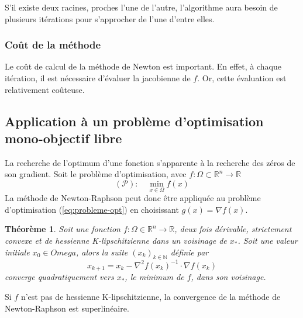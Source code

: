 \documentclass[3p, twocolumn]{elsarticle}
\newtheorem{thm}{Théorème}
\begin{document}
\begin{rmk}
S'il existe deux racines, proches l'une de l'autre, l'algorithme aura besoin de plusieurs itérations pour s'approcher de l'une d'entre elles.
\end{rmk}

\subsubsection{Coût de la méthode}
Le coût de calcul de la méthode de Newton est important. En effet, à chaque itération, il est nécessaire d’évaluer la jacobienne de $f$. Or, cette évaluation est relativement coûteuse.

\subsection{Application à un problème d'optimisation mono-objectif libre}
La recherche de l'optimum d'une fonction s'apparente à la recherche des zéros de son gradient.
Soit le problème d'optimisation, avec $f:\Omega \subset \mathbb{R}^n \rightarrow \mathbb{R}$
\begin{equation}
    (\mathscr{P}):\quad\min_{x\in \Omega} f(x)
    \label{eq:probleme-opt}
\end{equation}
La méthode de Newton-Raphson peut donc être appliquée au problème d'optimisation (\ref{eq:probleme-opt}) en choisissant $g(x)=\nabla f(x)$.
\begin{thm}
    Soit une fonction $f:\Omega \in \mathbb{R}^n\rightarrow \mathbb{R}$, deux fois dérivable, strictement convexe et de hessienne K-lipschitzienne dans un voisinage de $x_*$. Soit une valeur initiale $x_0\in Omega$, alors la suite $(x_k)_{k\in \mathbb{N}}$ définie par
    \begin{equation}
        x_{k+1}=x_k-\nabla^{2}f(x_k)^{-1}\cdot \nabla f(x_k)
        \label{eq:nr-opt-mono}
    \end{equation}
    converge quadratiquement vers $x_*$, le minimum de $f$, dans son voisinage.
\end{thm}

\begin{rmk}
    Si $f$ n'est pas de hessienne K-lipschitzienne, la convergence de la méthode de Newton-Raphson est superlinéaire.
\end{rmk}
\end{document}
